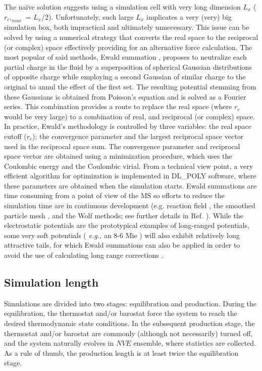 \documentclass[9pt,tutorial]{livecoms}
\begin{document}
The na\"{i}ve solution suggests using a simulation cell with very long
dimension $L_{x}$ ($r_{c},_{max}$ = $L_{x}$/2).
Unfortunately, such large $L_{x}$ implicates a very (very) big
simulation box, both impractical and ultimately unnecessary. This issue can
be solved by using a numerical strategy that converts the real space to
the reciprocal (or complex) space effectively providing for an alternative force
calculation.  The most popular of said methods, Ewald summation \citep{ewald1921},
proposes to neutralize
each partial charge in the fluid by a superposition of spherical Gaussian
distributions of opposite charge while employing a second Gaussian of similar
charge to the original to annul the effect of the first set. The resulting
potential stemming from these Gaussians is obtained from Poisson's equation and
is solved as a Fourier series. This combination provides a route to replace the
real space (where $r_{c}$ would be very large) to a combination of
real, and reciprocal (or complex) space. In practice, Ewald's methodology
is controlled by three variables: the real space cutoff ($r_{c}$); the
convergence parameter and the largest reciprocal space vector used in the
reciprocal space sum. The convergence parameter and reciprocal space vector are
obtained using a minimization procedure, which uses the Coulombic energy and
the Coulombic virial. From a technical view point, a very efficient algorithm
for optimization is implemented in DL\_POLY software, where these parameters are
obtained when the simulation starts. Ewald summations are time consuming from
a point of view of the MS so efforts to reduce the simulation time are in
continuous development (e.g. reaction field \citep{barker1973,watts1974},
the smoothed particle mesh \citep{darden1993},
and the Wolf \citep{wolf1999} methods; see further details in Ref. \citep{allen2017}).
While the electrostatic potentials are the
prototypical examples of long-ranged potentials, some very soft potentials
( \textit{e.g.,} an 8-6 Mie ) will also exhibit relatively long attractive
tails, for which Ewald summations can also be applied in order to avoid the use
of calculating long range corrections \citep{kissel}.

\subsection{Simulation length} 
\label{sec:length}
Simulations are divided into two stages: equilibration and production. During
the equilibration, the thermostat and/or barostat force the system to reach the
desired thermodynamic state conditions. In the subsequent production stage, the
thermostat and/or barostat are commonly (although not necessarily) turned off,
and the system naturally evolves in $NVE$ ensemble, where statistics are
collected. As a rule of thumb, the production length is at least twice the
equilibration stage. 
\end{document}
